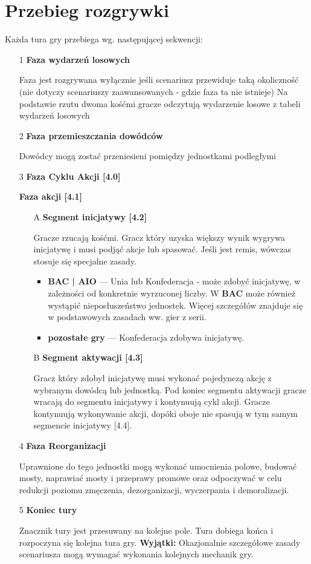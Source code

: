 \section{Przebieg rozgrywki}
Każda tura gry przebiega wg. następującej sekwencji:
\begin{itemize}
    \item[1] \textbf{Faza wydarzeń losowych}\par
    Faza jest rozgrywana wyłącznie jeśli scenariusz przewiduje taką okoliczność (nie dotyczy scenariuszy zaawansowanych - gdzie faza ta nie istnieje)
    Na podstawie rzutu dwoma kośćmi gracze odczytują wydarzenie losowe z tabeli wydarzeń losowych
    \item[2] \textbf{Faza przemieszczania dowódców}\par
    Dowódcy mogą zostać przeniesieni pomiędzy jednostkami podległymi
    \item[3] \textbf{Faza Cyklu Akcji [4.0]}\par
    \textbf{Faza akcji [4.1]} \par
    \begin{itemize}
        \item[A] \textbf{Segment inicjatywy [4.2]}\par
        Gracze rzucają kośćmi. Gracz który uzyska większy wynik wygrywa inicjatywę i musi podjąć akcje lub spasować.
        Jeśli jest remis, wówczas stosuje się specjalne zasady.
        \begin{itemize}
            \item \textbf{BAC | AIO} ---
            Unia lub Konfederacja - może zdobyć inicjatywę, w zależności od konkretnie wyrzuconej liczby.
            W \textbf{BAC} może również wystąpić nieposłuszeństwo jednostek.
            Więcej szczegółów znajduje się w podstawowych zasadach ww. gier z serii.
            \item \textbf{pozostałe gry} --- Konfederacja zdobywa inicjatywę.
        \end{itemize}
        \item[B] \textbf{Segment aktywacji [4.3]} \par
        Gracz który zdobył inicjatywę musi wykonać pojedynczą akcję z wybranym dowódcą lub jednostką.
        Pod koniec segmentu aktywacji gracze wracają do segmentu inicjatywy i kontynuują cykl akcji.
        Gracze kontynuują wykonywanie akcji, dopóki oboje nie spasują w tym samym segmencie inicjatywy [4.4].

    \end{itemize}
    \item[4] \textbf{Faza Reorganizacji}\par
    Uprawnione do tego jednostki mogą wykonać umocnienia polowe, budować mosty, naprawiać mosty i przeprawy promowe
    oraz odpoczywać w celu redukcji poziomu zmęczenia, dezorganizacji, wyczerpania i demoralizacji.
    \item[5] \textbf{Koniec tury}\par Znacznik tury jest przesuwany na kolejne pole. Tura dobiega końca i rozpoczyna się kolejna tura gry.
    \textbf{Wyjątki:} Okazjonalnie szczegółowe zasady scenariusza mogą wymagać wykonania kolejnych mechanik gry.
\end{itemize}